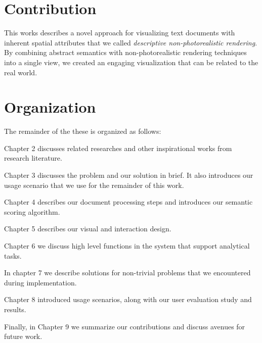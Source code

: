 \section{Contribution}
This works describes a novel approach for visualizing text documents with inherent spatial 
attributes that we called \emph{descriptive non-photorealistic rendering}.
By combining abstract semantics with non-photorealistic rendering techniques into a 
single view,  we created an engaging visualization that can be related to the real world.

 

 
\section{Organization}
The remainder of the these is organized as follows:
 
\noindent Chapter 2 discusses related researches and other inspirational works
from research literature.
 
\noindent Chapter 3 discusses the problem and our solution in brief. It also
introduces our usage scenario that we use for the remainder of this work.
 
\noindent Chapter 4 describes our document processing steps and introduces our
semantic scoring algorithm.
 
\noindent Chapter 5 describes our visual and interaction design. 
 
\noindent Chapter 6 we discuss high level functions in the system that support
analytical tasks.
 
\noindent In chapter 7 we describe solutions for non-trivial
problems that we encountered during implementation.

\noindent Chapter 8 introduced usage scenarios, along with our user evaluation
study and results.

\noindent Finally, in Chapter 9 we summarize our contributions and discuss
avenues for future work. 
  
 
  